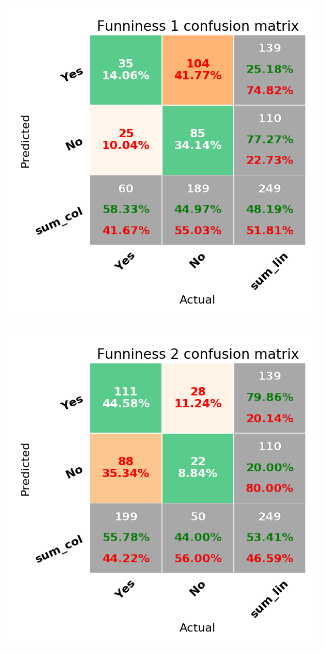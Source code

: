 \documentclass[draft,final,oneside]{vutinfth} %
\begin{document}
\begin{figure}
\centering

\begin{subfigure}[b]{0.45\textwidth}
\centering
\includegraphics[width=0.9\textwidth,height=0.3\textheight,keepaspectratio]{graphics/twostageperf/funniness1}
\end{subfigure}\quad
\begin{subfigure}[b]{0.45\textwidth}
\centering
\includegraphics[width=0.9\textwidth,height=0.3\textheight,keepaspectratio]{graphics/twostageperf/funniness2}
\end{subfigure}


\end{figure}
\end{document}
